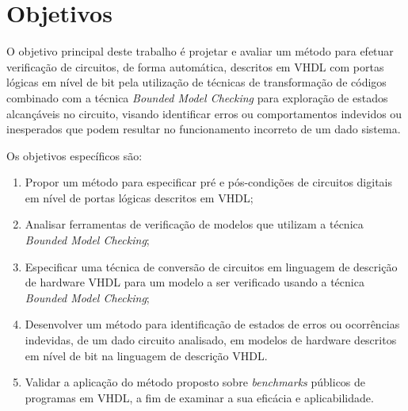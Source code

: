\section{Objetivos}
O objetivo principal deste trabalho é projetar e avaliar um método para efetuar verificação de circuitos, de forma automática, descritos em VHDL com portas lógicas em nível de bit pela utilização de técnicas de transformação de códigos combinado com a técnica \textit{Bounded Model Checking} para exploração de estados alcançáveis no circuito, visando identificar erros ou comportamentos indevidos ou inesperados que podem resultar no funcionamento incorreto de um dado sistema.

Os objetivos específicos são:
\begin{enumerate}
  \item Propor um método para especificar pré e pós-condições de circuitos digitais em nível de portas lógicas descritos em VHDL;
  \item Analisar ferramentas de verificação de modelos que utilizam a técnica \textit{Bounded Model Checking};
  \item Especificar uma técnica de conversão de circuitos em linguagem de descrição de hardware VHDL para um modelo a ser verificado usando a técnica \textit{Bounded Model Checking};
   \item Desenvolver um método para identificação de estados de erros ou ocorrências indevidas, de um dado circuito analisado, em modelos de hardware descritos em nível de bit na linguagem de descrição VHDL.
  \item Validar a aplicação do método proposto sobre \textit{benchmarks} públicos de programas em VHDL, a fim de examinar a sua eficácia e aplicabilidade.
\end{enumerate}

